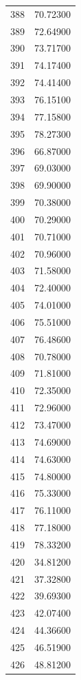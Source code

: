 \documentclass[
  letterpaper,
  DIV=11,
  numbers=noendperiod]{scrreprt}
\begin{document}
\begin{tcolorbox}
\begin{tabular}{lr}
388  &         70.72300 \\
389  &         72.64900 \\
390  &         73.71700 \\
391  &         74.17400 \\
392  &         74.41400 \\
393  &         76.15100 \\
394  &         77.15800 \\
395  &         78.27300 \\
396  &         66.87000 \\
397  &         69.03000 \\
398  &         69.90000 \\
399  &         70.38000 \\
400  &         70.29000 \\
401  &         70.71000 \\
402  &         70.96000 \\
403  &         71.58000 \\
404  &         72.40000 \\
405  &         74.01000 \\
406  &         75.51000 \\
407  &         76.48600 \\
408  &         70.78000 \\
409  &         71.81000 \\
410  &         72.35000 \\
411  &         72.96000 \\
412  &         73.47000 \\
413  &         74.69000 \\
414  &         74.63000 \\
415  &         74.80000 \\
416  &         75.33000 \\
417  &         76.11000 \\
418  &         77.18000 \\
419  &         78.33200 \\
420  &         34.81200 \\
421  &         37.32800 \\
422  &         39.69300 \\
423  &         42.07400 \\
424  &         44.36600 \\
425  &         46.51900 \\
426  &         48.81200 \\

\end{tabular}
\end{tcolorbox}
\end{document}

